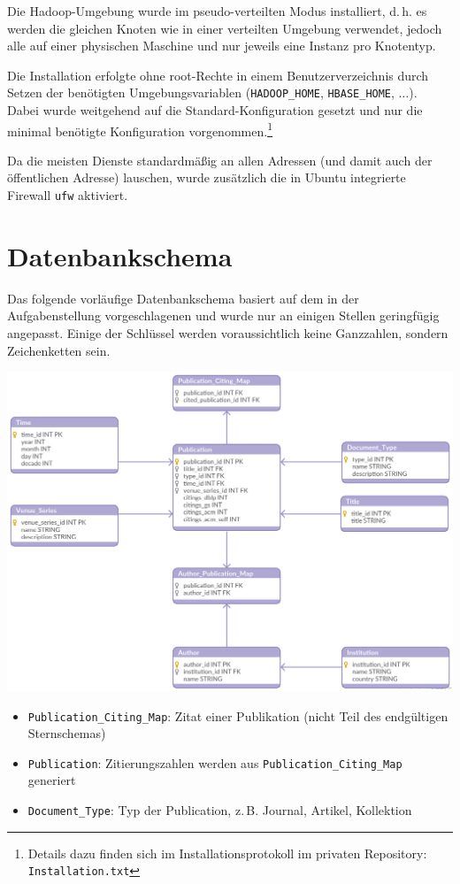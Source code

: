 \documentclass[a4paper,11pt,utf8]{scrartcl}
\begin{document}
Die Hadoop-Umgebung wurde im pseudo-verteilten Modus installiert, d.\,h. es werden die gleichen Knoten wie in einer verteilten Umgebung verwendet, jedoch alle auf einer physischen Maschine und nur jeweils eine Instanz pro Knotentyp.

Die Installation erfolgte ohne root-Rechte in einem Benutzerverzeichnis durch Setzen der benötigten Umgebungsvariablen (\texttt{HADOOP\_HOME}, \texttt{HBASE\_HOME}, $\dots$). Dabei wurde weitgehend auf die Standard-Konfiguration gesetzt und nur die minimal benötigte Konfiguration vorgenommen.\footnote{Details dazu finden sich im Installationsprotokoll im privaten Repository: \texttt{Installation.txt}}

Da die meisten Dienste standardmäßig an allen Adressen (und damit auch der öffentlichen Adresse) lauschen, wurde zusätzlich die in Ubuntu integrierte Firewall \texttt{ufw} aktiviert.

\section{Datenbankschema}

Das folgende vorläufige Datenbankschema basiert auf dem in der Aufgabenstellung vorgeschlagenen und wurde nur an einigen Stellen geringfügig angepasst. Einige der Schlüssel werden voraussichtlich keine Ganzzahlen, sondern Zeichenketten sein.

\noindent
\includegraphics[width=\textwidth]{schema.png}

\begin{itemize}
    \item \texttt{Publication\_Citing\_Map}: Zitat einer Publikation (nicht Teil des endgültigen Sternschemas)
    \item \texttt{Publication}: Zitierungszahlen werden aus \texttt{Publication\_Citing\_Map} generiert
    \item \texttt{Document\_Type}: Typ der Publication, z.\,B. Journal, Artikel, Kollektion
\end{itemize}
\end{document}
